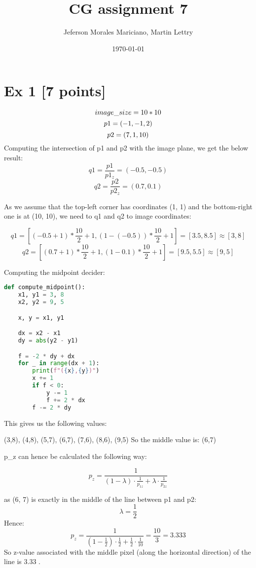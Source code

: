 \documentclass{article}
\title{CG assignment 7}
\author{Jeferson Morales Mariciano, Martin Lettry}
\date{\today}
\begin{document}
\maketitle

\section*{Ex 1 [7 points]}




\[
    image\_size = 10 * 10 \\
\]
\[
    p1 = (-1, -1, 2) \\
\]
\[
    p2 = (7, 1, 10) \\
\]
Computing the intersection of p1 and p2 with the image plane, we get the below result:
\[
    q1 = \frac{p1}{p1_z} = (-0.5, -0.5)
\]
\[
    q2 = \frac{p2}{p2_z} = (0.7, 0.1)
\]

As we assume that the top-left corner has coordinates (1, 1) and the bottom-right one is at (10, 10), we need to q1 and q2 to image coordinates:

\[
    q1 = [(-0.5 + 1) * \frac{10}{2} + 1, (1 - (-0.5)) * \frac{10}{2} + 1] = [3.5, 8.5] \approx [3, 8]
\]
\[
    q2 = [(0.7 + 1) * \frac{10}{2} + 1, (1 - 0.1) * \frac{10}{2} + 1]
    = [9.5, 5.5] \approx [9, 5]
\]


Computing the midpoint decider:

\begin{lstlisting}[language=Python]
def compute_midpoint():
    x1, y1 = 3, 8
    x2, y2 = 9, 5

    x, y = x1, y1

    dx = x2 - x1
    dy = abs(y2 - y1)

    f = -2 * dy + dx
    for _ in range(dx + 1):
        print(f"({x},{y})")
        x += 1
        if f < 0:
            y -= 1
            f += 2 * dx
        f -= 2 * dy
\end{lstlisting}


This gives us the following values:

(3,8), (4,8), (5,7), (6,7), (7,6), (8,6), (9,5)
So the middle value is: (6,7)

p\_z can hence be calculated the following way:

\[
    p_z = \frac{1}{(1 - \lambda) \cdot \frac{1}{p_{1z}} + \lambda \cdot \frac{1}{p_{2z}}}
\]

as (6, 7) is exactly in the middle of the line between p1 and p2:
\[
    \lambda = \frac{1}{2}
\]
Hence:
\[
    p_z = \frac{1}{(1 - \frac{1}{2}) \cdot \frac{1}{2} + \frac{1}{2} \cdot \frac{1}{10}} = \frac{10}{3} = 3.333
\]
So z-value associated with the middle pixel (along the horizontal direction) of the line is 3.33 .
\end{document}
